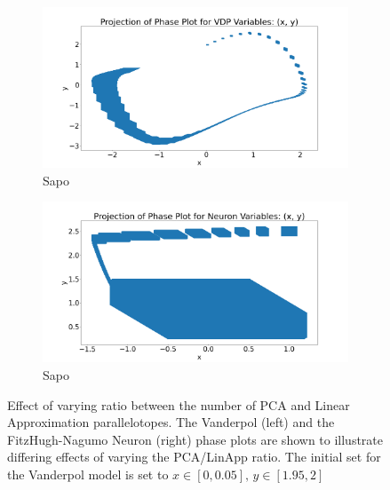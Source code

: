 \begin{figure}[h!]
\begin{subfigure}{0.5\textwidth}
\includegraphics[width=\textwidth]{figures/PhasePlots/VDP_Sapo_.png}
\caption{Sapo}
\end{subfigure}%
\begin{subfigure}{0.5\textwidth}
\includegraphics[width=\textwidth]{figures/PhasePlots/Neuron_Sapo_.png}
\caption{Sapo}
\end{subfigure}
\caption{Effect of varying ratio between the number of PCA and Linear Approximation parallelotopes. The Vanderpol (left) and the FitzHugh-Nagumo Neuron (right) phase plots are shown to illustrate differing effects of varying the PCA/LinApp ratio. The initial set for the Vanderpol model is set to $x \in [0,0.05], \, y \in [1.95,2]$}
\label{fig:PCALinAppRatio}
\end{figure}

\vspace{-1em}
